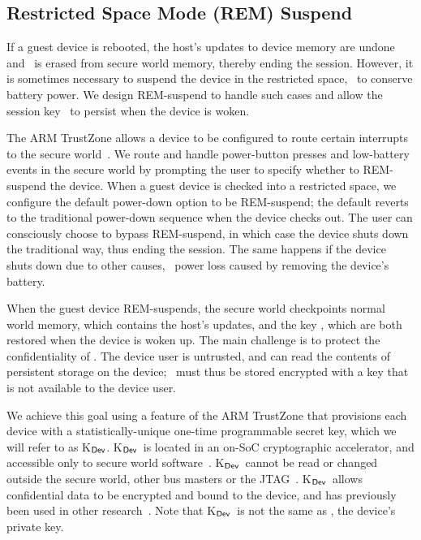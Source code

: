 
\subsection{Restricted Space Mode (REM) Suspend}
\label{section:mechanism:REMsuspend}

\newcommand{\kdev}{{\sf K$_{\sf Dev}$}}
%
If a guest device is rebooted, the host's updates to device memory are undone
and \ks\ is erased from secure world memory, thereby ending the session.
However, it is sometimes necessary to suspend the device in the restricted
space, \eg~to conserve battery power. We design REM-suspend to handle such
cases and allow the session key \ks\ to persist when the device is woken.

The ARM TrustZone allows a device to be configured to route certain interrupts
to the secure world~\cite{armtz}. We route and handle power-button presses and
low-battery events in the secure world by prompting the user to specify whether
to REM-suspend the device. When a guest device is checked into a restricted
space, we configure the default power-down option to be REM-suspend; the
default reverts to the traditional power-down sequence when the device checks
out. The user can consciously choose to bypass REM-suspend, in which case the
device shuts down the traditional way, thus ending the session. The same
happens if the device shuts down due to other causes, \eg~power loss caused by
removing the device's battery. 

When the guest device REM-suspends, the secure world checkpoints normal world
memory, which contains the host's updates, and the key \ks, which are both
restored when the device is woken up. The main challenge is to protect the
confidentiality of \ks. The device user is untrusted, and can read the contents
of persistent storage on the device; \ks\ must thus be stored encrypted with a
key that is not available to the device user.

We achieve this goal using a feature of the ARM TrustZone that provisions each
device with a statistically-unique one-time programmable secret key, which we
will refer to as \kdev. \kdev\ is located in an on-SoC cryptographic
accelerator, and accessible only to secure world
software~\cite[\S6.3.1]{armtz}. \kdev\ cannot be read or changed outside the
secure world, other bus masters or the JTAG~\cite{jtag}.  \kdev\ allows
confidential data to be encrypted and bound to the device, and has previously
been used in other research~\cite{tlr:asplos14,sentry:asplos15}.  Note that
\kdev\ is not the same as , the device's private key.


